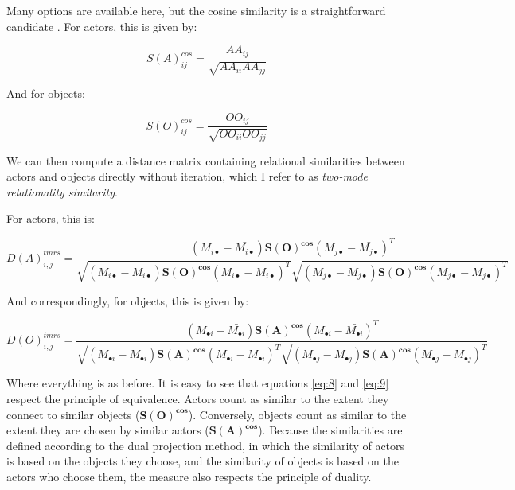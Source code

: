 \documentclass[a4paper,fleqn]{cas-sc}
\begin{document}
Many options are available here, but the cosine similarity is a straightforward candidate \citep[422]{goodman1996single}. For actors, this is given by:

\begin{equation}
    S(A)^{cos}_{ij} = \frac{AA_{ij}}{\sqrt{AA_{ii}AA_{jj}}}
    \label{eq:6}
\end{equation}

And for objects:

\begin{equation}
    S(O)^{cos}_{ij} = \frac{OO_{ij}}{\sqrt{OO_{ii}OO_{jj}}}
    \label{eq:7}
\end{equation}

We can then compute a distance matrix containing relational similarities between actors and objects directly without iteration, which I refer to as \textit{two-mode relationality similarity}. 

For actors, this is:

\begin{equation}
    D(A)^{tmrs}_{i,j} = 
    \frac{
    (M_{i\bullet} - \bar{M_{i\bullet}})
    \mathbf{S(O)^{cos}}
    (M_{j\bullet} - \bar{M_{j\bullet}})^T
    }
    {
    \sqrt{
    (M_{i\bullet} - \bar{M_{i\bullet}})
    \mathbf{S(O)^{cos}}
    (M_{i\bullet} - \bar{M_{i\bullet}})^T
    }
    \sqrt{
    (M_{j\bullet} - \bar{M_{j\bullet}})
    \mathbf{S(O)^{cos}}
    (M_{j\bullet} - \bar{M_{j\bullet}})^T
        }
    }
    \label{eq:8}
\end{equation}

And correspondingly, for objects, this is given by:

\begin{equation}
    D(O)^{tmrs}_{i,j} = 
    \frac{
    (M_{\bullet i} - \bar{M_{\bullet i}})
    \mathbf{S(A)^{cos}}
    (M_{\bullet i} - \bar{M_{\bullet i}})^T
    }
    {
    \sqrt{
    (M_{\bullet i} - \bar{M_{\bullet i}})
    \mathbf{S(A)^{cos}}
    (M_{\bullet i} - \bar{M_{\bullet i}})^T
    }
    \sqrt{
    (M_{\bullet j} - \bar{M_{\bullet j}})
    \mathbf{S(A)^{cos}}
    (M_{\bullet j} - \bar{M_{\bullet j}})^T
        }
    }
    \label{eq:9}
\end{equation}

Where everything is as before. It is easy to see that equations \ref{eq:8} and \ref{eq:9} respect the principle of equivalence. Actors count as similar to the extent they connect to similar objects ($\mathbf{S(O)^{cos}}$). Conversely, objects count as similar to the extent they are chosen by similar actors ($ \mathbf{S(A)^{cos}}$). Because the similarities are defined according to the dual projection method, in which the similarity of actors is based on the objects they choose, and the similarity of objects is based on the actors who choose them, the measure also respects the principle of duality.
\end{document}
